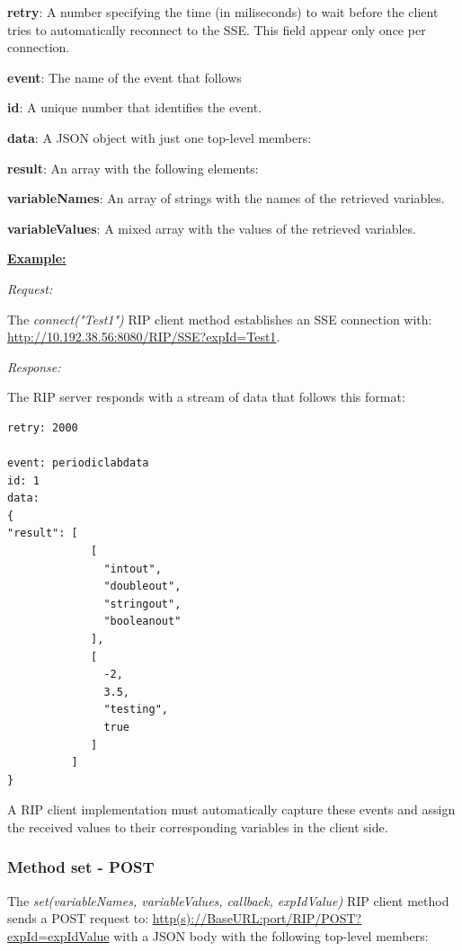 \begin{myEnumerate}
    \item \textbf{retry}: A number specifying the time (in miliseconds) to wait before the client tries to automatically reconnect to the SSE. This field appear only once per connection.
    \item \textbf{event}: The name of the event that follows
    \item \textbf{id}: A unique number that identifies the event.
    \item \textbf{data}: A JSON object with just one top-level members:
    \begin{myEnumerate}
        \item \textbf{result}: An array with the following elements:
        \begin{myEnumerate}
            \item \textbf{variableNames}: An array of strings with the names of the retrieved variables.
            \item \textbf{variableValues}: A mixed array with the values of the retrieved variables.
        \end{myEnumerate}
    \end{myEnumerate}
\end{myEnumerate}

\textbf{\underline{Example:}}

\textit{Request:}

The \textit{connect("Test1")} RIP client method establishes an SSE connection with: \url{http://10.192.38.56:8080/RIP/SSE?expId=Test1}.

\textit{Response:}

The RIP server responds with a stream of data that follows this format:

\begin{lstlisting}
retry: 2000

event: periodiclabdata
id: 1
data: 
{
"result": [
             [
               "intout",
               "doubleout",
               "stringout",
               "booleanout"
             ],
             [
               -2,
               3.5,
               "testing",
               true
             ]
          ]
}
\end{lstlisting}

A RIP client implementation must automatically capture these events and assign the received values to their corresponding variables in the client side.

\subsubsection{Method set - POST}
\label{sec:set}
The \textit{set(variableNames, variableValues, callback, expIdValue)} RIP client method sends a POST request to: \url{http(s)://BaseURL:port/RIP/POST?expId=expIdValue} with a JSON body with the following top-level members:

